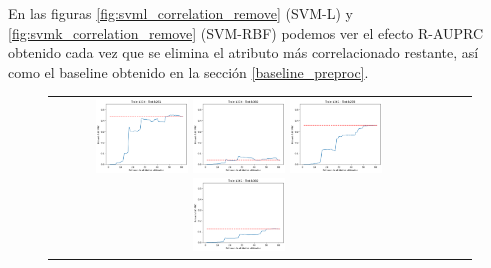 En las figuras \ref{fig:svml_correlation_remove} (SVM-L) y \ref{fig:svmk_correlation_remove} (SVM-RBF) podemos ver el efecto R-AUPRC obtenido cada vez que se elimina el atributo más correlacionado restante, así como el baseline obtenido en la sección \ref{baseline_preproc}.

\begin{figure}[h!]
\begin{tabular}{cccc}
  \includegraphics[width=0.25\textwidth]{Kap6/pearson_linear_INDIVIDUAL_CURVES_train=b234test=b261}  \includegraphics[width=0.25\textwidth]{Kap6/pearson_linear_INDIVIDUAL_CURVES_train=b234test=b360}
  \includegraphics[width=0.25\textwidth]{Kap6/pearson_linear_INDIVIDUAL_CURVES_train=b261test=b278}  \includegraphics[width=0.25\textwidth]{Kap6/pearson_linear_INDIVIDUAL_CURVES_train=b261test=b360} \\


\end{tabular}
\end{figure}

